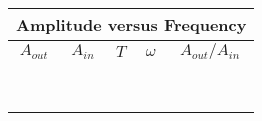 \begin{table}[htb]
\begin{center}
\begin{tabular}{|c|c|c|c|c|}
\hline
\multicolumn{5}{|c|}{Amplitude versus Frequency}\\
\hline 
$A_{out}$ & $A_{in}$ & $T$ & $\omega$ & $A_{out}/A_{in}$ \\
\hline
\hspace*{2.5cm} & \hspace*{2.5cm} & \hspace*{2.5cm} & \hspace*{2.5cm} &
\hspace*{2.5cm} \\
\hspace*{2.5cm} & \hspace*{2.5cm} & \hspace*{2.5cm} & \hspace*{2.5cm} &
\hspace*{2.5cm} \\


\hline       
\hspace*{2.5cm} & \hspace*{2.5cm} & \hspace*{2.5cm} & \hspace*{2.5cm} &
\hspace*{2.5cm} \\
\hspace*{2.5cm} & \hspace*{2.5cm} & \hspace*{2.5cm} & \hspace*{2.5cm} &
\hspace*{2.5cm} \\ 


\hline       
\hspace*{2.5cm} & \hspace*{2.5cm} & \hspace*{2.5cm} & \hspace*{2.5cm} &
\hspace*{2.5cm} \\
\hspace*{2.5cm} & \hspace*{2.5cm} & \hspace*{2.5cm} & \hspace*{2.5cm} &
\hspace*{2.5cm} \\


\hline       
\hspace*{2.5cm} & \hspace*{2.5cm} & \hspace*{2.5cm} & \hspace*{2.5cm} &
\hspace*{2.5cm} \\
\hspace*{2.5cm} & \hspace*{2.5cm} & \hspace*{2.5cm} & \hspace*{2.5cm} &
\hspace*{2.5cm} \\



\end{tabular}
\end{center}
\end{table}
